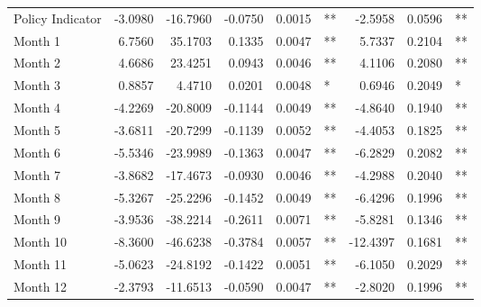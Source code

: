 \begin{table}
\begin{tabular}{l r r r r l r r l}
Policy Indicator          &  -3.0980        &  -16.7960       &  -0.0750        &  0.0015       &   **       &  -2.5958        &  0.0596       &   **       \\ 
Month 1                         &  6.7560        &  35.1703       &  0.1335        &  0.0047       &   **       &  5.7337        &  0.2104       &   **       \\ 
Month 2                         &  4.6686        &  23.4251       &  0.0943        &  0.0046       &   **       &  4.1106        &  0.2080       &   **       \\ 
Month 3                         &  0.8857        &  4.4710       &  0.0201        &  0.0048       &    *       &  0.6946        &  0.2049       &    *       \\ 
Month 4                         &  -4.2269        &  -20.8009       &  -0.1144        &  0.0049       &   **       &  -4.8640        &  0.1940       &   **       \\ 
Month 5                         &  -3.6811        &  -20.7299       &  -0.1139        &  0.0052       &   **       &  -4.4053        &  0.1825       &   **       \\ 
Month 6                         &  -5.5346        &  -23.9989       &  -0.1363        &  0.0047       &   **       &  -6.2829        &  0.2082       &   **       \\ 
Month 7                         &  -3.8682        &  -17.4673       &  -0.0930        &  0.0046       &   **       &  -4.2988        &  0.2040       &   **       \\ 
Month 8                         &  -5.3267        &  -25.2296       &  -0.1452        &  0.0049       &   **       &  -6.4296        &  0.1996       &   **       \\ 
Month 9                         &  -3.9536        &  -38.2214       &  -0.2611        &  0.0071       &   **       &  -5.8281        &  0.1346       &   **       \\ 
Month 10                        &  -8.3600        &  -46.6238       &  -0.3784        &  0.0057       &   **       &  -12.4397        &  0.1681       &   **       \\ 
Month 11                        &  -5.0623        &  -24.8192       &  -0.1422        &  0.0051       &   **       &  -6.1050        &  0.2029       &   **       \\ 
Month 12                        &  -2.3793        &  -11.6513       &  -0.0590        &  0.0047       &   **       &  -2.8020        &  0.1996       &   **       \\ 


\end{tabular}
\end{table}
